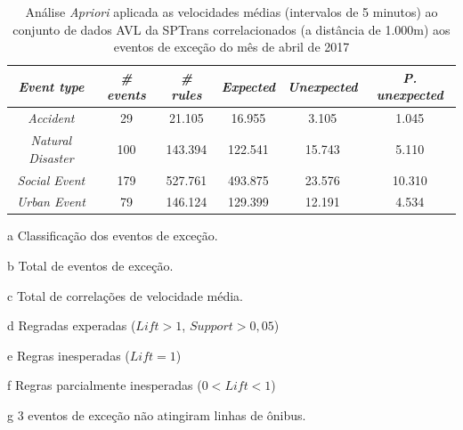 \documentclass[
	12pt,				%
	oneside,			%
	a4paper,			%
	english,			%
	brazil				%
	]{abntex2ppgsi}
\begin{document}
\begin{apendicesenv}
\begin{table}[!htb]
\centering
\begin{threeparttable}
\caption {Análise \textit{Apriori} aplicada as velocidades médias (intervalos de 5 minutos) ao conjunto de dados AVL da SPTrans correlacionados (a distância de 1.000m) aos eventos de exceção do mês de abril de 2017}
\label {tab:aprioriFull}
\begin{tabular}{c|c|c|c|c|c}
\hline
\textbf{\textit{Event type}}\tnote{a} & \textbf{\textit{\# events}}\tnote{b} & \textit{\textbf{\# rules}}\tnote{c} & \textbf{\textit{Expected}}\tnote{d} & \textbf{\textit{Unexpected}}\tnote{e} & \textbf{\textit{P. unexpected}}\tnote{f}   \\
\hline
\textit{Accident} & 29 & 21.105 & 16.955 & 3.105 & 1.045 \\
\textit{Natural Disaster} & 100 & 143.394 & 122.541 & 15.743 & 5.110 \\
\textit{Social Event} & 179 & 527.761 & 493.875 & 23.576 & 10.310 \\
\textit{Urban Event} & 79 & 146.124 & 129.399 & 12.191 & 4.534 \\
\hline
\end{tabular}
\begin{tablenotes}
            \item[a] Classificação dos eventos de exceção.
            \item[b] Total de eventos de exceção.
            \item[c] Total de correlações de velocidade média.
            \item[d] Regradas experadas ($Lift > 1$, $Support > 0,05$)
            \item[e] Regras inesperadas ($Lift = 1$)
            \item[f] Regras parcialmente inesperadas ($0 < Lift < 1$)
            \item[g] 3 eventos de exceção não atingiram linhas de ônibus.
        \end{tablenotes}
\end{threeparttable}
\end{table}



\end{apendicesenv}
\end{document}
